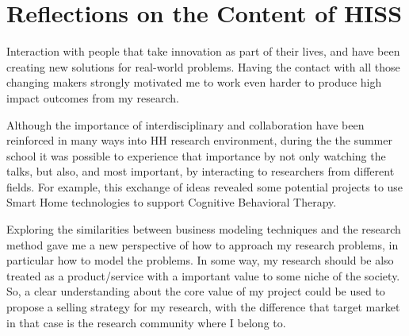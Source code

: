 \section{Reflections on the Content of HISS}

Interaction with people that take innovation as part of their lives, and have been creating new solutions for real-world problems. Having the contact with all those changing makers strongly motivated me to work even harder to produce high impact outcomes from my research.
 
Although the importance of interdisciplinary and collaboration have been reinforced in many ways into HH research environment, during the the summer school it was possible to experience that importance by not only watching the talks, but also, and most important, by interacting to researchers from different fields. 
For example, this exchange of ideas revealed some potential projects to use Smart Home technologies to support Cognitive Behavioral Therapy.

Exploring the similarities between business modeling techniques and the research method gave me a new perspective of how to approach my research problems, in particular how to model the problems. 
In some way, my research should be also treated as a product/service with a important value to some niche of the society. 
So, a clear understanding about the core value of my project could be used to propose a selling strategy for my research, with the difference that target market in that case is the research community where I belong to.